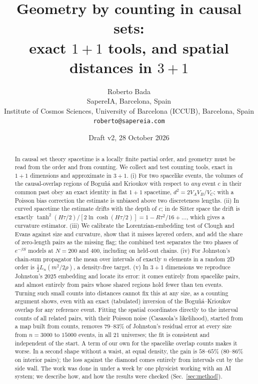 \documentclass[11pt,a4paper]{article}
\title{Geometry by counting in causal sets:\\ exact $1+1$ tools, and spatial distances in $3+1$}
\author{Roberto Bada\\ \small SapereIA, Barcelona, Spain\\ \small Institute of Cosmos Sciences, University of Barcelona (ICCUB), Barcelona, Spain\\ \small \texttt{roberto@sapereia.com}}
\date{Draft v2, 28 October 2026}
\begin{document}
\maketitle

\begin{abstract}
In causal set theory spacetime is a locally finite partial order, and geometry must be read from the order and from counting. We collect and test counting tools, exact in $1+1$ dimensions and approximate in $3+1$. (i) For two spacelike events, the volumes of the causal-overlap regions of Bogu\~n\'a and Krioukov with respect to \emph{any} event $c$ in their common past obey an exact identity in flat $1+1$ spacetime, $d^2=2V_AV_B/V_C$; with a Poisson bias correction the estimate is unbiased above two discreteness lengths. (ii) In curved spacetime the estimate drifts with the depth of $c$; in de Sitter space the drift is exactly $\tanh^2(H\tau/2)/[2\ln\cosh(H\tau/2)]=1-R\tau^2/16+\dots$, which gives a curvature estimator. (iii) We calibrate the Lorentzian-embedding test of Clough and Evans against size and curvature, show that it misses layered orders, and add the share of zero-length pairs as the missing flag; the combined test separates the two phases of $e^{-\beta S}$ models at $N=200$ and $400$, including on held-out chains. (iv) For Johnston's chain-sum propagator the mean over intervals of exactly $n$ elements in a random 2D order is $\tfrac12L_n(m^2/2\rho)$, a density-free target. (v) In $3+1$ dimensions we reproduce Johnston's 2025 embedding and locate its error: it comes entirely from spacelike pairs, and almost entirely from pairs whose shared regions hold fewer than ten events. Turning such small counts into distances cannot fix this at any size, as a counting argument shows, even with an exact (tabulated) inversion of the Bogu\~n\'a--Krioukov overlap for any reference event. Fitting the spatial coordinates directly to the interval counts of all related pairs, with their Poisson noise (Casasola's likelihood), started from a map built from counts, removes $79$--$83\%$ of Johnston's residual error at every size from $n=3000$ to $15000$ events, in all 21 universes; the fit is consistent and independent of the start. A term of our own for the spacelike overlap counts makes it worse. In a second shape without a waist, at equal density, the gain is $58$--$65\%$ ($80$--$86\%$ on interior pairs); the loss against the diamond comes entirely from intervals cut by the side wall. The work was done in under a week by one physicist working with an AI system; we describe how, and how the results were checked (Sec.~\ref{sec:method}).
\end{abstract}
\end{document}
